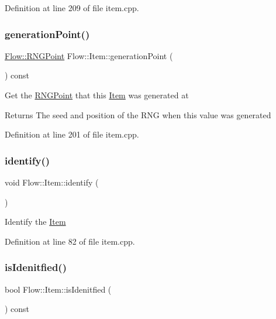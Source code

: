 Definition at line 209 of file item.\+cpp.

\hypertarget{class_flow_1_1_item_ad40180fcaf6fdd43fb3b9321387beca2}{}\label{class_flow_1_1_item_ad40180fcaf6fdd43fb3b9321387beca2} 
\subsubsection{\texorpdfstring{generation\+Point()}{generationPoint()}\hspace{0.1cm}{\footnotesize\ttfamily [2/2]}}
{\footnotesize\ttfamily \hyperlink{struct_flow_1_1_r_n_g_point}{Flow\+::\+R\+N\+G\+Point} Flow\+::\+Item\+::generation\+Point (\begin{DoxyParamCaption}{ }\end{DoxyParamCaption}) const}

Get the \hyperlink{struct_flow_1_1_r_n_g_point}{R\+N\+G\+Point} that this \hyperlink{class_flow_1_1_item}{Item} was generated at \begin{DoxyReturn}{Returns}
The seed and position of the R\+NG when this value was generated 
\end{DoxyReturn}


Definition at line 201 of file item.\+cpp.

\hypertarget{class_flow_1_1_item_aad72c7a574fa3ab77a4a01f0f7be8589}{}\label{class_flow_1_1_item_aad72c7a574fa3ab77a4a01f0f7be8589} 
\subsubsection{\texorpdfstring{identify()}{identify()}}
{\footnotesize\ttfamily void Flow\+::\+Item\+::identify (\begin{DoxyParamCaption}{ }\end{DoxyParamCaption})}

Identify the \hyperlink{class_flow_1_1_item}{Item} 

Definition at line 82 of file item.\+cpp.

\hypertarget{class_flow_1_1_item_ad87cbf57ff2a9ff9f141af741e5755e5}{}\label{class_flow_1_1_item_ad87cbf57ff2a9ff9f141af741e5755e5} 
\subsubsection{\texorpdfstring{is\+Idenitfied()}{isIdenitfied()}}
{\footnotesize\ttfamily bool Flow\+::\+Item\+::is\+Idenitfied (\begin{DoxyParamCaption}{ }\end{DoxyParamCaption}) const}

